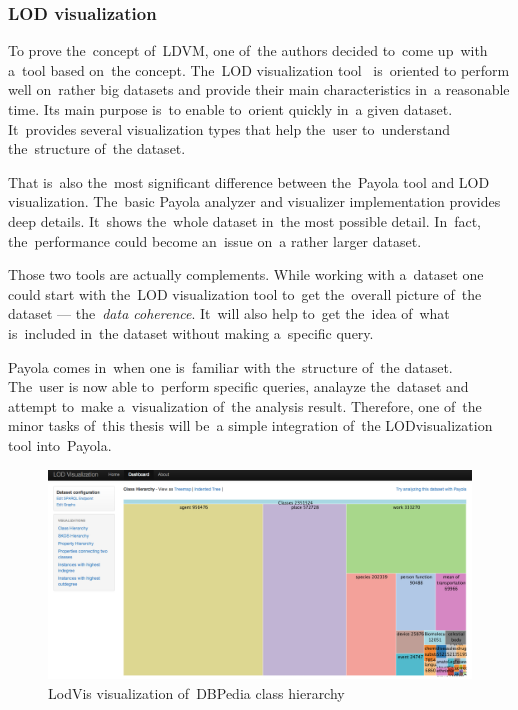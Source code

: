 \subsubsection{LOD visualization}
\label{rw:lodvis}
To prove the~concept of~LDVM, one of~the authors decided to~come up~with a~tool 
based on~the concept. The~LOD visualization tool~\cite{lodvis} is~oriented
to perform well on~rather big datasets and 
provide their main characteristics in~a reasonable time. Its main purpose is~to 
enable to~orient quickly in~a given dataset. It~provides several 
visualization types that help the~user to~understand the~structure of~the 
dataset.

That is~also the~most significant difference between the~Payola tool and LOD 
visualization. The~basic Payola analyzer and visualizer implementation provides 
deep details. It~shows the~whole dataset in~the most possible detail. In~fact, 
the~performance could become an~issue on~a rather larger dataset.

Those two tools are actually complements. While working with a~dataset one could 
start with the~LOD visualization tool to~get the~overall picture of~the dataset --- 
the~\emph{data coherence}. It~will also help to~get the~idea of~what is~included in~the 
dataset without making a~specific query.

Payola comes in~when one is~familiar with the~structure of~the dataset. The~user 
is now able to~perform specific queries, analayze the~dataset and attempt to~make a~visualization of~the analysis result. Therefore, one of~the minor tasks of~this thesis
will be~a simple integration of~the LODvisualization tool into~Payola.

\begin{figure}
	\centering
	\includegraphics[width=140mm]{img/lodvis.png}
	\caption{LodVis visualization of~DBPedia class hierarchy}
	\label{fig:lodvis}
\end{figure}


